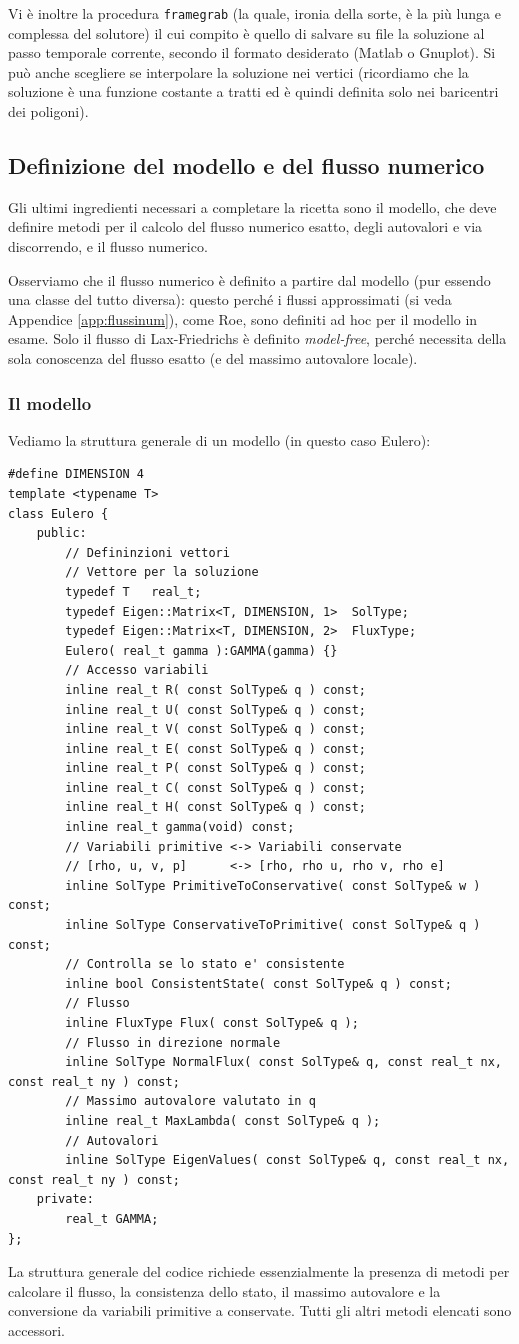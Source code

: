 Vi è inoltre la procedura \texttt{framegrab} (la quale, ironia della sorte, è la più lunga e complessa del solutore) il cui compito è quello di salvare su file la soluzione al passo temporale corrente, secondo il formato desiderato (Matlab o Gnuplot). Si può anche scegliere se interpolare la soluzione nei vertici (ricordiamo che la soluzione è una funzione costante a tratti ed è quindi definita solo nei baricentri dei poligoni).

\subsection{Definizione del modello e del flusso numerico}
Gli ultimi ingredienti necessari a completare la ricetta sono il modello, che deve definire metodi per il calcolo del flusso numerico esatto, degli autovalori e via discorrendo, e il flusso numerico.

Osserviamo che il flusso numerico è definito a partire dal modello (pur essendo una classe del tutto diversa): questo perché i flussi approssimati (si veda Appendice \ref{app:flussinum}), come Roe, sono definiti ad hoc per il modello in esame. Solo il flusso di Lax-Friedrichs è definito \emph{model-free}, perché necessita della sola conoscenza del flusso esatto (e del massimo autovalore locale).
\subsubsection{Il modello}
Vediamo la struttura generale di un modello (in questo caso Eulero):
\begin{lstlisting}
#define DIMENSION 4
template <typename T>
class Eulero {
	public:
		// Defininzioni vettori
		// Vettore per la soluzione
		typedef T	real_t;
		typedef Eigen::Matrix<T, DIMENSION, 1>	SolType;
		typedef Eigen::Matrix<T, DIMENSION, 2>	FluxType;
		Eulero( real_t gamma ):GAMMA(gamma) {}
		// Accesso variabili
		inline real_t R( const SolType& q ) const;
		inline real_t U( const SolType& q ) const;
		inline real_t V( const SolType& q ) const;
		inline real_t E( const SolType& q ) const;
		inline real_t P( const SolType& q ) const;
		inline real_t C( const SolType& q ) const;
		inline real_t H( const SolType& q ) const;
		inline real_t gamma(void) const;
		// Variabili primitive <-> Variabili conservate
		// [rho, u, v, p]      <-> [rho, rho u, rho v, rho e]
		inline SolType PrimitiveToConservative( const SolType& w ) const;
		inline SolType ConservativeToPrimitive( const SolType& q ) const;
		// Controlla se lo stato e' consistente
		inline bool ConsistentState( const SolType& q ) const;
		// Flusso
		inline FluxType Flux( const SolType& q );
		// Flusso in direzione normale
		inline SolType NormalFlux( const SolType& q, const real_t nx, const real_t ny ) const;
		// Massimo autovalore valutato in q
		inline real_t MaxLambda( const SolType& q );
		// Autovalori
		inline SolType EigenValues( const SolType& q, const real_t nx, const real_t ny ) const;
	private:
		real_t GAMMA;
};
\end{lstlisting}
La struttura generale del codice richiede essenzialmente la presenza di metodi per calcolare il flusso, la consistenza dello stato, il massimo autovalore e la conversione da variabili primitive a conservate. Tutti gli altri metodi elencati sono accessori.

